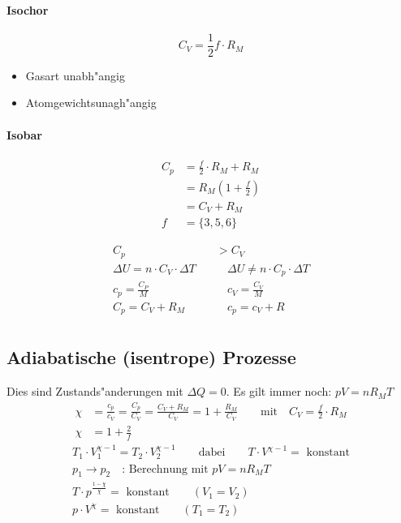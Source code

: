\paragraph{Isochor}
\begin{equation*}
	C_V=\frac{1}{2}f\cdot R_M
\end{equation*}
\begin{itemize}
	\item Gasart unabh"angig
	\item Atomgewichtsunagh"angig
\end{itemize}

\paragraph{Isobar}
\begin{align*}
	C_p &= \frac{f}{2}\cdot R_M+R_M \\
	    &= R_M\left(1+\frac{f}{2}\right) \\
	    &= C_V+R_M \\
	f   &= \{3,5,6\}
\end{align*}

\begin{align*}
	C_p & > C_V \\
	\Delta U = n\cdot C_V\cdot\Delta T\quad & \quad \Delta U \neq n\cdot C_p\cdot\Delta T \\
	c_p=\frac{C_P}{M} \quad & \quad c_V=\frac{C_V}{M} \\
	C_p=C_V+R_M\quad & \quad c_p=c_V+R \\
\end{align*}

\subsection{Adiabatische (isentrope) Prozesse}
Dies sind Zustands"anderungen mit $\Delta Q=0$. Es gilt immer noch: $pV=nR_MT$
\begin{align}
	\chi &= \frac{c_p}{c_V}=\frac{C_p}{C_V}=\frac{C_V+R_M}{C_V}=1+\frac{R_M}{C_V}\qquad\text{mit}\quad C_V=\frac{f}{2}\cdot R_M \\
	\chi &= 1+\frac{2}{f}
\end{align}
\begin{gather*}
	T_1\cdot V_1^{\chi-1}=T_2\cdot V_2^{\chi-1}\qquad\text{dabei}\qquad T\cdot V^{\chi-1}=\text{ konstant} \\
	p_1\rightarrow p_2\quad\text{: Berechnung mit } pV=nR_MT \\
	T\cdot p^{\frac{1-\chi}{\chi}}=\text{ konstant}\qquad (V_1=V_2) \\
	p\cdot V^\chi =\text{ konstant}\qquad (T_1=T_2)
\end{gather*}

